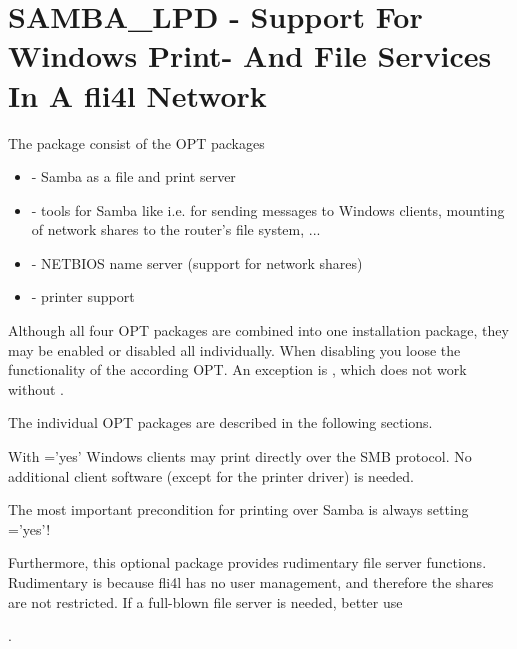 \section{SAMBA\_LPD - Support For Windows Print- And File Services In A fli4l Network}

The package  consist of the OPT packages

\begin{itemize}
\item {} - Samba as a file and print server
\item {} - tools for Samba like i.e.
  for sending messages to Windows clients, mounting of
  network shares to the router's file system, ...
\item {} - NETBIOS name server (support for network shares)
\item {} - printer support
\end{itemize}

Although all four OPT packages are combined into one installation package,
they may be enabled or disabled all individually. When disabling you loose the
functionality of the according OPT. An exception is , which does
not work without .


The individual OPT packages are described in the following sections.



    With ='yes' Windows clients may print directly over the SMB protocol.
    No additional client software (except for the printer driver) is needed.

    The most important precondition for printing over Samba is always setting
     ='yes'!

    Furthermore, this optional package provides rudimentary
    file server functions.
    Rudimentary is because fli4l has no user management, and therefore the
    shares are not restricted. If a full-blown file server is needed, better use

        .

